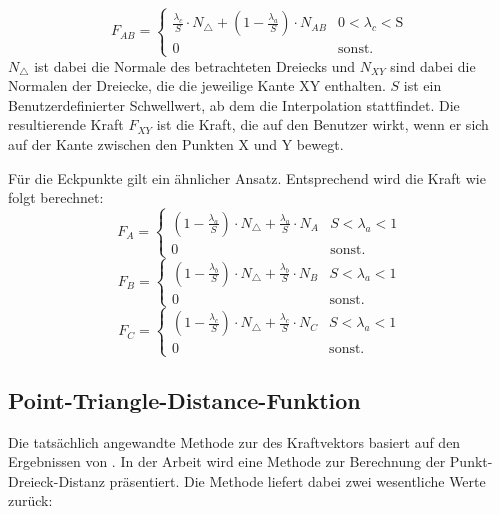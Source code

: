 \documentclass[conference]{IEEEtran}
\begin{document}
\begin{equation*}
    F_{AB} = 
    \begin{cases} 
        \frac{\lambda_c}{S}\cdot N_{\triangle} + (1-\frac{\lambda_a}{S})\cdot N_{AB} &  0 < \lambda_c < \text{S} \\
        0 & \text{sonst.}
    \end{cases}
\end{equation*}
$N_{\triangle}$ ist dabei die Normale des betrachteten Dreiecks und $N_{XY}$ sind dabei die Normalen der 
Dreiecke, die die jeweilige Kante XY enthalten. $S$ ist ein Benutzerdefinierter Schwellwert, ab dem die 
Interpolation stattfindet.
Die resultierende Kraft $F_{XY}$ ist die Kraft, die auf den Benutzer wirkt, wenn er sich auf der Kante 
zwischen den Punkten X und Y bewegt.

Für die Eckpunkte gilt ein ähnlicher Ansatz. Entsprechend wird die Kraft wie folgt berechnet:
\begin{equation*}
    F_{A} = 
    \begin{cases} 
        (1-\frac{\lambda_a}{S})\cdot N_{\triangle} + \frac{\lambda_a}{S}\cdot N_{A} &  S < \lambda_a < 1 \\
        0 & \text{sonst.}
    \end{cases}
\end{equation*} 
\begin{equation*}
    F_{B} = 
    \begin{cases} 
        (1-\frac{\lambda_b}{S})\cdot N_{\triangle} + \frac{\lambda_b}{S}\cdot N_{B} &  S < \lambda_a < 1 \\
        0 & \text{sonst.}
    \end{cases}
\end{equation*} 
\begin{equation*}
    F_{C} = 
    \begin{cases} 
        (1-\frac{\lambda_c}{S})\cdot N_{\triangle} + \frac{\lambda_c}{S}\cdot N_{C} &  S < \lambda_a < 1 \\
        0 & \text{sonst.}
    \end{cases}
\end{equation*} 

\subsection{Point-Triangle-Distance-Funktion}\label{dist}
Die tatsächlich angewandte Methode zur des Kraftvektors basiert auf den Ergebnissen 
von . In der Arbeit wird eine Methode zur Berechnung der 
Punkt-Dreieck-Distanz präsentiert. Die Methode liefert dabei zwei wesentliche Werte zurück:
\end{document}
